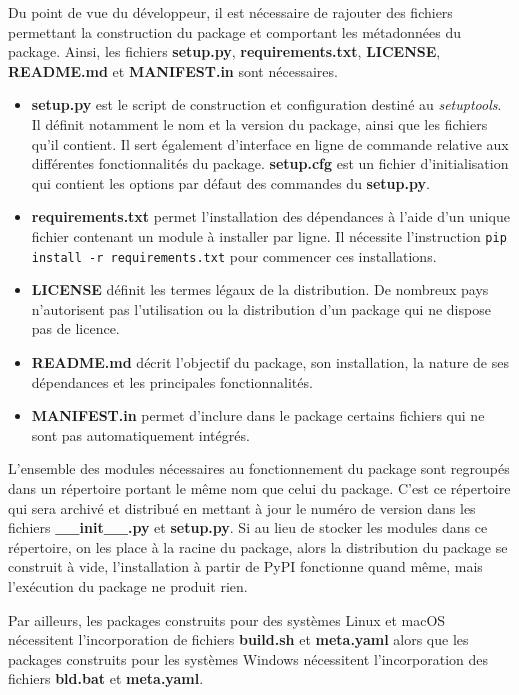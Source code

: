 \documentclass[twoside,a4paper,11pt,frenchb,openany]{report}
\begin{document}
Du point de vue du développeur, il est nécessaire de rajouter des fichiers permettant la construction du package et comportant les métadonnées du package. Ainsi, les fichiers \textbf{setup.py}, \textbf{requirements.txt}, \textbf{LICENSE},  \textbf{README.md} et \textbf{MANIFEST.in} sont nécessaires.  
\begin{itemize}
\item \textbf{setup.py} est le script de construction et configuration destiné au \textit{setuptools}. Il définit notamment le nom et la version du package, ainsi que les fichiers qu'il contient. Il sert également d'interface en ligne de commande relative aux différentes fonctionnalités du package. \textbf{setup.cfg} est un fichier d'initialisation qui contient les options par défaut des commandes du \textbf{setup.py}.
\item \textbf{requirements.txt} permet l'installation des dépendances à l'aide d'un unique fichier contenant un module à installer par ligne. Il nécessite l'instruction 
\texttt{pip install -r requirements.txt}
pour commencer ces installations.
\item \textbf{LICENSE} définit les termes légaux de la distribution. De nombreux pays n'autorisent pas l'utilisation ou la distribution d'un package qui ne dispose pas de licence.
\item \textbf{README.md} décrit l'objectif du package, son installation, la nature de ses dépendances et les principales fonctionnalités.
\item \textbf{MANIFEST.in} permet d'inclure dans le package certains fichiers qui ne sont pas automatiquement intégrés. 
\end{itemize}

L'ensemble des modules nécessaires au fonctionnement du package sont regroupés dans un répertoire portant le même nom que celui du package. C'est ce répertoire qui sera archivé et distribué en mettant à jour le numéro de version dans les fichiers \textbf{\_\_init\_\_.py} et \textbf{setup.py}. Si au lieu de stocker les modules dans ce répertoire, on les place à la racine du package, alors la distribution du package se construit à vide, l'installation à partir de PyPI fonctionne quand même, mais l'exécution du package ne produit rien.

Par ailleurs, les packages construits pour des systèmes Linux et macOS nécessitent l'incorporation de fichiers \textbf{build.sh} et \textbf{meta.yaml} alors que les packages construits pour les systèmes Windows nécessitent l'incorporation des fichiers \textbf{bld.bat} et \textbf{meta.yaml}.
\end{document}
